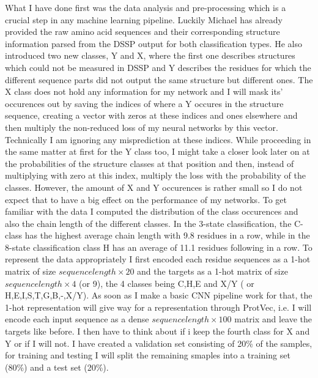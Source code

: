 \documentclass{article}
\begin{document}
What I have done first was the data analysis and pre-processing which is a crucial step in any machine learning pipeline. Luckily Michael has already provided the raw amino acid sequences and their corresponding structure information parsed from the DSSP output for both classification types. He also introduced two new classes, Y and X, where the first one describes structures which could not be measured in DSSP and Y describes the residues for which the different sequence parts did not output the same structure but different ones. The X class does not hold any information for my network and I will mask its' occurences out by saving the indices of where a Y occures in the structure sequence, creating a vector with zeros at these indices and ones elsewhere and then multiply the non-reduced loss of my neural networks by this vector. Technically I am ignoring any misprediction at these indices. While proceeding in the same matter at first for the Y class too, I might take a closer look later on at the probabilities of the structure classes at that position and then, instead of multiplying with zero at this index, multiply the loss with the probability of the classes. However, the amount of X and Y occurences is rather small so I do not expect that to have a big effect on the performance of my networks.
To get familiar with the data I computed the distribution of the class occurences and also the chain length of the different classes. In the 3-state classification, the C-class has the highest average chain length with 9.8 residues in a row, while in the 8-state classification class H has an average of 11.1 residues following in a row.
To represent the data appropriately I first encoded each residue sequences as a 1-hot matrix of size $sequence length \times 20$ and the targets as a 1-hot matrix of size $sequence length \times 4$ (or 9), the 4 classes being C,H,E and X/Y ( or H,E,I,S,T,G,B,-,X/Y). As soon as I make a basic CNN pipeline work for that, the 1-hot representation will give way for a representation through ProtVec, i.e. I will encode each input sequence as a dense $sequence length \times 100$ matrix and leave the targets like before. I then have to think about if i keep the fourth class for X and Y or if I will not.
I have created a validation set consisting of 20\% of the samples, for training and testing I will split the remaining smaples into a training set (80\%) and a test set (20\%).
\end{document}
